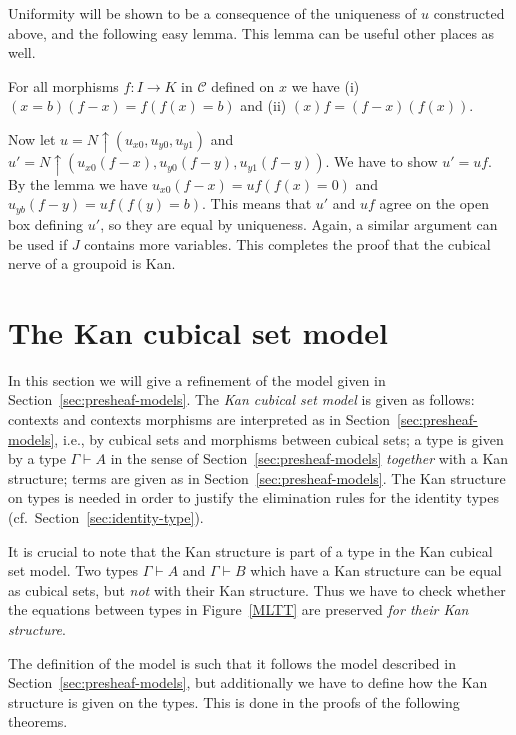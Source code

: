 \documentclass[10pt,a4paper]{article}
\newcommand{\CC}{{\mathcal C}}
\newcommand{\rup}[1]{#1{\uparrow}}
\begin{document}
Uniformity will be shown to be a consequence of the uniqueness of
$u$ constructed above, and the following easy lemma.
This lemma can be useful other places as well.
\begin{lemma}  For all morphisms $f:I\to K$ in $\CC$ defined on $x$ we have
(i) $(x=b)(f-x) = f (f(x)=b)$ and (ii) $(x)f = (f-x)(f(x))$.
\end{lemma}
Now let $u=\rup{N}(u_{x0},u_{y0},u_{y1})$ and
$u'=\rup{N}(u_{x0}(f-x),u_{y0}(f-y),u_{y1}(f-y))$.
We have to show $u'=uf$.
By the lemma we have $u_{x0}(f-x) = uf(f(x)=0)$ and $u_{yb}(f-y) = uf(f(y)=b)$.
This means that $u'$ and $uf$ agree on the open box defining $u'$,
so they are equal by uniqueness.
Again, a similar argument can be used if $J$ contains more variables.
This completes the proof that the cubical nerve of a groupoid is Kan.

\section{The Kan cubical set model}\label{sec:kancubsetmodel}

In this section we will give a refinement of the model given in
Section~\ref{sec:presheaf-models}.  The \emph{Kan cubical set model}
is given as follows: contexts and contexts morphisms are interpreted
as in Section~\ref{sec:presheaf-models}, i.e., by cubical sets and
morphisms between cubical sets; a type is given by a type $\Gamma
\vdash A$ in the sense of Section~\ref{sec:presheaf-models}
\emph{together} with a Kan structure; terms are given as in
Section~\ref{sec:presheaf-models}. The Kan structure on types is
needed in order to justify the elimination rules for the identity
types (cf.\ Section~\ref{sec:identity-type}).

It is crucial to note that the Kan structure is part of a type in the
Kan cubical set model.  Two types $\Gamma \vdash A$ and $\Gamma \vdash
B$ which have a Kan structure can be equal as cubical sets, but
\emph{not} with their Kan structure.  Thus we have to check whether
the equations between types in Figure~\ref{MLTT} are preserved
\emph{for their Kan structure}.

The definition of the model is such that it follows the model
described in Section~\ref{sec:presheaf-models}, but additionally we
have to define how the Kan structure is given on the types.  This is
done in the proofs of the following theorems.
\end{document}
